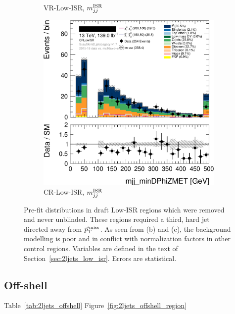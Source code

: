 \begin{figure}[tp]
\begin{subfigure}{0.48\textwidth}
\caption{VR-Low-ISR, $m_{jj}^\mathrm{ISR}$}
\end{subfigure}
\hfill
\begin{subfigure}{0.48\textwidth}
\centering
\includegraphics[width=\textwidth]{figures/2ljets_vrlow_old_crlowisr.png}
\caption{CR-Low-ISR, $m_{jj}^\mathrm{ISR}$}
\end{subfigure}
\caption[
Pre-fit distributions in draft Low-ISR regions
]{%
Pre-fit distributions in draft Low-ISR regions which were removed and never
unblinded.
These regions required a third, hard jet directed away from $\vec p_\mathrm{T}^\mathrm{\:miss}$.
As seen from (b) and (c), the background modelling is poor and in conflict
with normalization factors in other control regions.
Variables are defined in the text of Section~\ref{sec:2ljets_low_isr}.
Errors are statistical.
}
\label{fig:2ljets_low_isr_old}
\end{figure}


\FloatBarrier
\subsection{Off-shell}
\label{sec:2ljets_offshell}
Table~\ref{tab:2ljets_offshell}
Figure~\ref{fig:2ljets_offshell_region}

